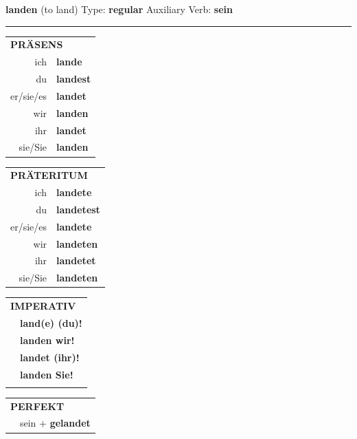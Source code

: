 \documentclass[10pt,a4paper]{revtex4-2}
\begin{document}
\begin{verbbox}
    {\Large \bf landen} (to land) \hfill Type: \textbf{regular} \hfill Auxiliary Verb: \textbf{sein} 
    
     \vspace{5pt}

    \hrule
    
    \vspace{5pt}

  \begin{tabular}{rl}
     \multicolumn{2}{l}{\textbf{PRÄSENS} }\\
    ich & \textbf{lande}\\
    du & \textbf{landest}\\
    er/sie/es & \textbf{landet}\\
    wir & \textbf{landen}\\
    ihr & \textbf{landet}\\
    sie/Sie & \textbf{landen}\\
  \end{tabular}
  \hfill
     \begin{tabular}{rl}
    \multicolumn{2}{l}{\textbf{PRÄTERITUM} }\\
    ich & \textbf{landete}\\
    du & \textbf{landetest}\\
    er/sie/es & \textbf{landete}\\
    wir & \textbf{landeten}\\
    ihr & \textbf{landetet}\\
    sie/Sie & \textbf{landeten}\\
  \end{tabular}
  \hfill
  \begin{tabular}{rl}
     \multicolumn{2}{l}{\textbf{IMPERATIV} }\\
   & \textbf{land(e) (du)!}\\
   & \textbf{landen wir!}\\
   & \textbf{landet (ihr)!}\\
   & \textbf{landen Sie!}\\
   & \vspace{10pt}
  \end{tabular}

    \vspace{10pt}

 \begin{tabular}{rl}
     \multicolumn{2}{l}{\textbf{PERFEKT}}\\
   & sein + \textbf{gelandet}\\
  \end{tabular}
\hfill
   \begin{tabular}{rl}
   

\end{tabular}
\end{verbbox}
\end{document}
